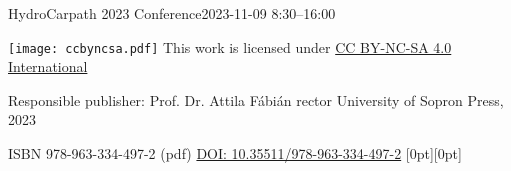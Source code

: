 \vspace*{\fill}

\footnotesize{}
\noindent{}HydroCarpath 2023 Conference\newline{}2023-11-09 8:30–16:00
\vspace*{5mm}

\noindent{}\texttt{[image: ccbyncsa.pdf]}\newline{}
This work is licensed under \href{https://creativecommons.org/licenses/by-nc-nd/4.0/deed.en}{CC BY-NC-SA 4.0 International}

\noindent{}Responsible publisher: Prof. Dr. Attila Fábián rector \newline{} University of Sopron Press, 2023

\noindent ISBN 978-963-334-497-2 (pdf)\newline{}
\noindent \href{https://doi.org/10.35511/978-963-334-497-2}{DOI: 10.35511/978-963-334-497-2}
\hspace*{\fill} \hspace{1mm} \raisebox{0mm}[0pt][0pt]{}
\normalsize{}

\setcounter{page}{2}
\cleardoublepage{}
\fancyhead[LE,RO]{\thepage}

\setcounter{secnumdepth}{0}%
{}
\tableofcontents{}
\newpage{}
{}

\setcounter{articleid}{0}
{}


{}
\printindex


